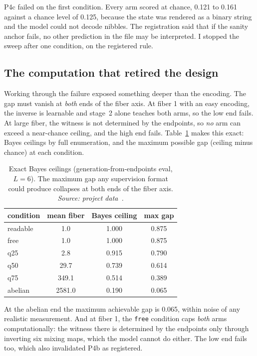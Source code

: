 P4c failed on the first condition. Every arm scored at chance, 0.121 to 0.161 against a chance level of 0.125, because the state was rendered as a binary string and the model could not decode nibbles. The registration said that if the sanity anchor fails, no other prediction in the file may be interpreted. I stopped the sweep after one condition, on the registered rule.

\subsection{The computation that retired the design}

Working through the failure exposed something deeper than the encoding. The gap must vanish at \emph{both} ends of the fiber axis. At fiber 1 with an easy encoding, the inverse is learnable and stage~2 alone teaches both arms, so the low end fails. At large fiber, the witness is not determined by the endpoints, so \emph{no} arm can exceed a near-chance ceiling, and the high end fails. Table~\ref{tab:ceiling} makes this exact: Bayes ceilings by full enumeration, and the maximum possible gap (ceiling minus chance) at each condition.

\begin{table}[htbp]
\centering\footnotesize
\caption{Exact Bayes ceilings (generation-from-endpoints eval, $L = 6$). The maximum gap any supervision format could produce collapses at both ends of the fiber axis. \emph{Source: project data~\cite{appliedrepo2026}.}}
\label{tab:ceiling}
\begin{tabular}{lccc}
\toprule
condition & mean fiber & Bayes ceiling & max gap \\
\midrule
readable & 1.0 & 1.000 & 0.875 \\
free & 1.0 & 1.000 & 0.875 \\
q25 & 2.8 & 0.915 & 0.790 \\
q50 & 29.7 & 0.739 & 0.614 \\
q75 & 349.1 & 0.514 & 0.389 \\
abelian & 2581.0 & 0.190 & 0.065 \\
\bottomrule
\end{tabular}
\end{table}

At the abelian end the maximum achievable gap is 0.065, within noise of any realistic measurement. And at fiber 1, the \texttt{free} condition caps \emph{both} arms computationally: the witness there is determined by the endpoints only through inverting six mixing maps, which the model cannot do either. The low end fails too, which also invalidated P4b as registered.

